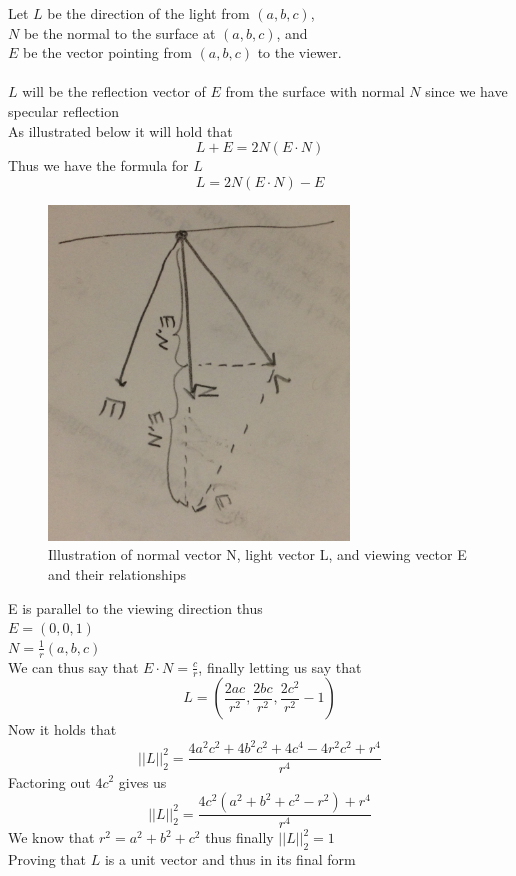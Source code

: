 \documentclass[11pt,psfig]{article}
\begin{document}
Let $L$ be the direction of the light from $(a,b,c)$, \\
$N$ be the normal to the surface at $(a,b,c)$, and \\
$E$ be the vector pointing from $(a,b,c)$ to the viewer. \\
\\
$L$ will be the reflection vector of $E$ from the surface with normal $N$ since we have specular reflection\\
As illustrated below it will hold that
\[
L + E = 2N(E \cdot N)
\]
Thus we have the formula for $L$
\[
L = 2N(E \cdot N) - E
\]
\begin{figure}[H]
\centering
\includegraphics[height=3.5in]{prob1diagram.jpg}
\caption{Illustration of normal vector N, light vector L, and viewing vector E and their relationships}
\end{figure}

\newpage

E is parallel to the viewing direction thus \\
$E=(0,0,1)$\\
$N = \frac{1}{r}(a,b,c)$\\
We can thus say that $E \cdot N = \frac{c}{r}$, finally letting us say that
\[
L = (\frac{2ac}{r^2},\frac{2bc}{r^2},\frac{2c^2}{r^2} - 1)
\]
Now it holds that
\[
||L||_2^2 = \frac{4a^2c^2 + 4b^2c^2 + 4c^4 - 4r^2c^2 + r^4}{r^4}
\]
Factoring out $4c^2$ gives us
\[
||L||_2^2 = \frac{4c^2(a^2 + b^2 + c^2 - r^2) + r^4}{r^4}
\]
We know that $r^2 = a^2 + b^2 + c^2$ thus finally $||L||_2^2 = 1$\\
Proving that $L$ is a unit vector and thus in its final form

\newpage
\end{document}

